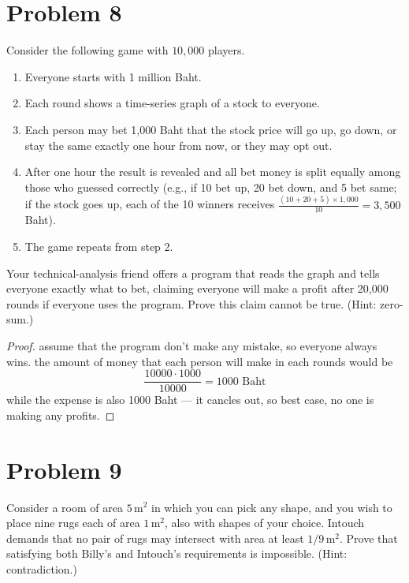 \section*{Problem 8}
Consider the following game with $10{,}000$ players.
\begin{enumerate}[label=\arabic*.]
    \item Everyone starts with 1 million Baht.
    \item Each round shows a time-series graph of a stock to everyone.
    \item Each person may bet 1{,}000 Baht that the stock price will go up, go down, or stay the same exactly one hour from now, or they may opt out.
    \item After one hour the result is revealed and all bet money is split equally among those who guessed correctly (e.g., if 10 bet up, 20 bet down, and 5 bet same; if the stock goes up, each of the 10 winners receives $\frac{(10+20+5)\times 1{,}000}{10} = 3{,}500$ Baht).
    \item The game repeats from step 2.
\end{enumerate}
Your technical-analysis friend offers a program that reads the graph and tells everyone exactly what to bet, claiming everyone will make a profit after 20{,}000 rounds if everyone uses the program. Prove this claim cannot be true. (Hint: zero-sum.)

\medskip
\solution

\begin{proof}
  assume that the program don't make any mistake, so everyone always
  wins. the amount of money that each person will make in each rounds
  would be
  \[
  \frac{10000 \cdot 1000}{10000} = 1000 \text{ Baht}
  \]
  while the expense is also 1000 Baht --- it cancles out, so best case,
  no one is making any profits.
\end{proof}

\vspace{1em}
\hrulefill


\section*{Problem 9}
Consider a room of area $5\,\text{m}^2$ in which you can pick any shape, and you wish to place nine rugs each of area $1\,\text{m}^2$, also with shapes of your choice. Intouch demands that no pair of rugs may intersect with area at least $1/9\,\text{m}^2$. Prove that satisfying both Billy's and Intouch's requirements is impossible. (Hint: contradiction.)

